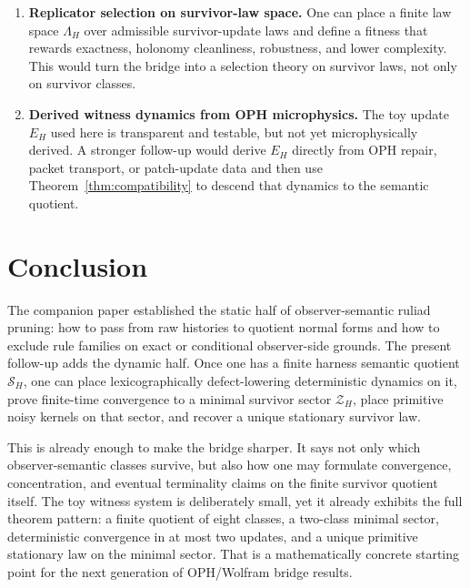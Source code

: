 \documentclass[11pt]{article}
\theoremstyle{remark}
\theoremstyle{plain}
\begin{document}
\begin{enumerate}[leftmargin=2em]
\item \textbf{Replicator selection on survivor-law space.}
One can place a finite law space \(\Lambda_H\) over admissible survivor-update laws and define a fitness that rewards exactness, holonomy cleanliness, robustness, and lower complexity. This would turn the bridge into a selection theory on survivor laws, not only on survivor classes.
\item \textbf{Derived witness dynamics from OPH microphysics.}
The toy update \(E_H\) used here is transparent and testable, but not yet microphysically derived. A stronger follow-up would derive \(E_H\) directly from OPH repair, packet transport, or patch-update data and then use Theorem~\ref{thm:compatibility} to descend that dynamics to the semantic quotient.
\end{enumerate}

\section{Conclusion}

The companion paper established the static half of observer-semantic ruliad pruning: how to pass from raw histories to quotient normal forms and how to exclude rule families on exact or conditional observer-side grounds. The present follow-up adds the dynamic half. Once one has a finite harness semantic quotient \(\mathcal S_H\), one can place lexicographically defect-lowering deterministic dynamics on it, prove finite-time convergence to a minimal survivor sector \(\mathcal Z_H\), place primitive noisy kernels on that sector, and recover a unique stationary survivor law.

This is already enough to make the bridge sharper. It says not only which observer-semantic classes survive, but also how one may formulate convergence, concentration, and eventual terminality claims on the finite survivor quotient itself. The toy witness system is deliberately small, yet it already exhibits the full theorem pattern: a finite quotient of eight classes, a two-class minimal sector, deterministic convergence in at most two updates, and a unique primitive stationary law on the minimal sector. That is a mathematically concrete starting point for the next generation of OPH/Wolfram bridge results.
\end{document}
